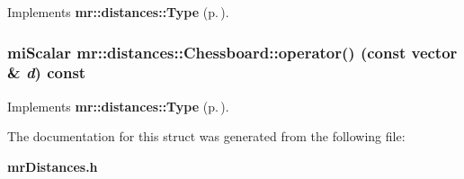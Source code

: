Implements {\bf mr::distances::Type} {\rm (p.\,\pageref{structmr_1_1distances_1_1Type_a1})}.
\subsubsection{\setlength{\rightskip}{0pt plus 5cm}mi\-Scalar mr::distances::Chessboard::operator() (const {\bf vector} \& {\em d}) const\hspace{0.3cm}{\tt  [inline, virtual]}}\label{structmr_1_1distances_1_1Chessboard_a0}




Implements {\bf mr::distances::Type} {\rm (p.\,\pageref{structmr_1_1distances_1_1Type_a0})}.

The documentation for this struct was generated from the following file:\begin{CompactItemize}
\item 
{\bf mr\-Distances.h}\end{CompactItemize}
